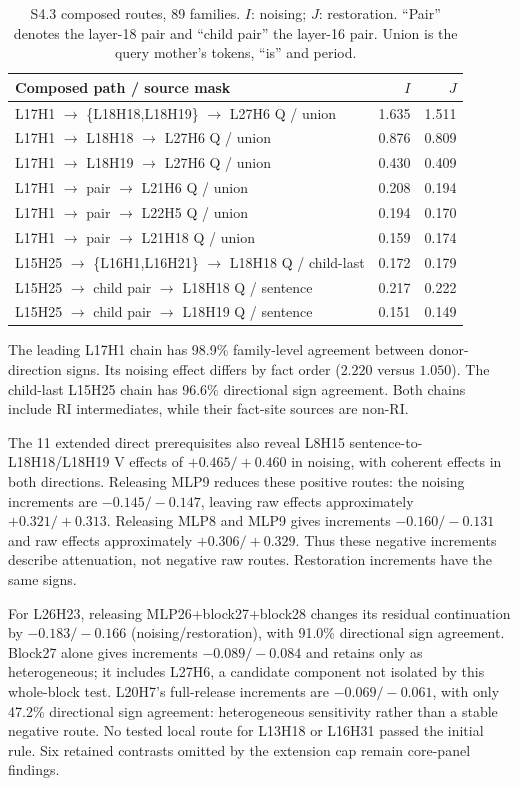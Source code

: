 \begin{table}[t]
\centering\scriptsize
\setlength{\tabcolsep}{3pt}
\begin{tabular}{@{}p{4.8cm}rr@{}}
\toprule
Composed path / source mask & $I$ & $J$ \\
\midrule
L17H1 $\to$ \{L18H18,L18H19\} $\to$ L27H6 Q / union & 1.635 & 1.511 \\
L17H1 $\to$ L18H18 $\to$ L27H6 Q / union & 0.876 & 0.809 \\
L17H1 $\to$ L18H19 $\to$ L27H6 Q / union & 0.430 & 0.409 \\
L17H1 $\to$ pair $\to$ L21H6 Q / union & 0.208 & 0.194 \\
L17H1 $\to$ pair $\to$ L22H5 Q / union & 0.194 & 0.170 \\
L17H1 $\to$ pair $\to$ L21H18 Q / union & 0.159 & 0.174 \\
L15H25 $\to$ \{L16H1,L16H21\} $\to$ L18H18 Q / child-last & 0.172 & 0.179 \\
L15H25 $\to$ child pair $\to$ L18H18 Q / sentence & 0.217 & 0.222 \\
L15H25 $\to$ child pair $\to$ L18H19 Q / sentence & 0.151 & 0.149 \\
\bottomrule
\end{tabular}
\caption{S4.3 composed routes, 89 families. $I$: noising; $J$: restoration.
``Pair'' denotes the layer-18 pair and ``child pair'' the layer-16 pair.
Union is the query mother's tokens, ``is'' and period.}
\label{tab:s43-chains}
\end{table}

The leading L17H1 chain has 98.9\% family-level agreement between donor-direction
signs. Its noising effect differs by fact order ($2.220$ versus $1.050$).
The child-last L15H25 chain has 96.6\% directional sign agreement.
Both chains include RI intermediates, while their fact-site sources are non-RI.

The 11 extended direct prerequisites also reveal L8H15 sentence-to-L18H18/L18H19
V effects of $+0.465/+0.460$ in noising, with coherent effects in both directions.
Releasing MLP9 reduces these positive routes: the noising increments are
$-0.145/-0.147$, leaving raw effects approximately $+0.321/+0.313$.
Releasing MLP8 and MLP9 gives increments $-0.160/-0.131$ and raw effects
approximately $+0.306/+0.329$. Thus these negative increments describe attenuation,
not negative raw routes. Restoration increments have the same signs.

For L26H23, releasing MLP26+block27+block28 changes its residual continuation by
$-0.183/-0.166$ (noising/restoration), with 91.0\% directional sign agreement.
Block27 alone gives increments $-0.089/-0.084$ and retains only as heterogeneous;
it includes L27H6, a candidate component not isolated by this whole-block test.
L20H7's full-release increments are $-0.069/-0.061$, with only 47.2\% directional
sign agreement: heterogeneous sensitivity rather than a stable negative route.
No tested local route for L13H18 or L16H31 passed the initial rule. Six retained
contrasts omitted by the extension cap remain core-panel findings.

